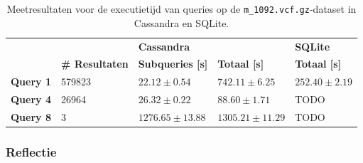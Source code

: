 \begin{table}[h]
\begin{tabular}{@{}lllll@{}}
\cmidrule(l){3-5}
                              &         & \multicolumn{2}{|l|}{\textbf{Cassandra}}                                                      & \multicolumn{1}{l|}{\textbf{SQLite}}                             \\ 
\cmidrule(l){2-5}
\multicolumn{1}{l|}{}  & \multicolumn{1}{l|}{\textbf{\# Resultaten}}               & \multicolumn{1}{l|}{\textbf{Subqueries [s]}} & \multicolumn{1}{l|}{\textbf{Totaal [s]}} & \multicolumn{1}{l|}{\textbf{Totaal [s]}} \\ \midrule
\multicolumn{1}{|l|}{\textbf{Query 1}} & \multicolumn{1}{l|}{579823} & \multicolumn{1}{l|}{$22.12 \pm 0.54$}             & \multicolumn{1}{l|}{$742.11 \pm 6.25$}          & \multicolumn{1}{l|}{$252.40 \pm 2.19$}                         \\
\multicolumn{1}{|l|}{\textbf{Query 4}} & \multicolumn{1}{l|}{26964} &\multicolumn{1}{l|}{$26.32 \pm 0.22$}            & \multicolumn{1}{l|}{$88.60 \pm 1.71$}            & \multicolumn{1}{l|}{\color{red} TODO}                         \\
\multicolumn{1}{|l|}{\textbf{Query 8}} & \multicolumn{1}{l|}{3} &\multicolumn{1}{l|}{$1276.65 \pm 13.88$} & \multicolumn{1}{l|}{$1305.21 \pm 11.29$}       & \multicolumn{1}{l|}{\color{red} TODO}                                \\ 
\bottomrule
\end{tabular}
\caption{Meetresultaten voor de executietijd van queries op de \texttt{m\_1092.vcf.gz}-dataset in Cassandra en SQLite.}
\end{table}

\subsubsection{Reflectie}

